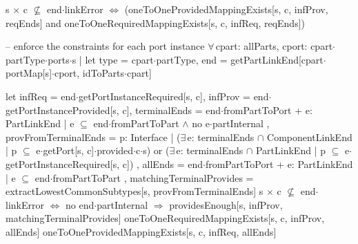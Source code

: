 {{{      s$\,\times\,$c $\not\subseteq$ end$\cdot$linkError $\Longleftrightarrow$
        (oneToOneProvidedMappingExists[s, c, infProv, reqEnds] and
         oneToOneRequiredMappingExists[s, c, infReq, reqEnds])
    }

    -- enforce the constraints for each port instance
    $\forall\,$cpart: allParts,
      cport: cpart$\cdot$partType$\cdot$ports$\cdot$s |
    let
      type = cpart$\cdot$partType,
      end = getPartLinkEnd[cpart$\cdot$portMap[s]$\cdot$cport, idToParts$\cdot$cpart]
    {
      
      {
        let
          infReq = end$\cdot$getPortInstanceRequired[s, c],        
          infProv = end$\cdot$getPortInstanceProvided[s, c],
          terminalEnds = end$\cdot$fromPartToPort +
            { e: PartLinkEnd |
              e $\subseteq$ end$\cdot$fromPartToPart $\wedge$ no e$\cdot$partInternal
            },
          provFromTerminalEnds =
            { p: Interface |
              {
                ($\exists\,$e: terminalEnds $\cap$ ComponentLinkEnd |
                  p $\subseteq$ e$\cdot$getPort[s, c]$\cdot$provided$\cdot$c$\cdot$s)
                or
                ($\exists\,$e: terminalEnds $\cap$ PartLinkEnd |
                  p $\subseteq$ e$\cdot$getPortInstanceRequired[s, c])
              }
            },
          allEnds = end$\cdot$fromPartToPort +
            { e: PartLinkEnd |
              e $\subseteq$ end$\cdot$fromPartToPart
            },
          matchingTerminalProvides =
            extractLowestCommonSubtypes[s, provFromTerminalEnds]
        {
          s$\,\times\,$c $\not\subseteq$ end$\cdot$linkError $\Longleftrightarrow$
          {
            no end$\cdot$partInternal $\Longrightarrow$
              providesEnough[s, infProv, matchingTerminalProvides]
            oneToOneRequiredMappingExists[s, c, infProv, allEnds]
            oneToOneProvidedMappingExists[s, c, infReq, allEnds]
          }
        }
      }
    }
  }
}

